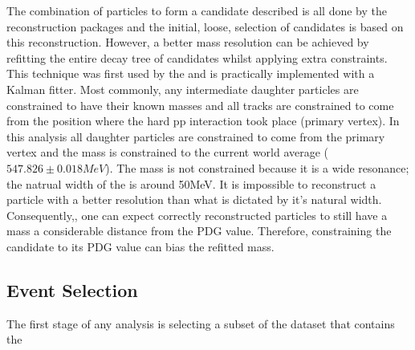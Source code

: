 The combination of particles to form a \Bd candidate described is all done by the \lhcb reconstruction packages and the initial, loose, selection of \Bd candidates is based on this reconstruction. However, a better mass resolution can be achieved by refitting the entire decay tree of \Bd candidates whilst applying extra constraints.  This technique was first used by the \babar and is practically implemented with a Kalman fitter\cite{Hulsbergen:2005pu}.  Most commonly, any intermediate daughter particles are constrained to have their known masses and all tracks are constrained to come from the position where the hard pp interaction took place (primary vertex).  In this analysis all daughter particles are constrained to come from the primary vertex and the \etaz mass is constrained to the current world average ($547.826\pm0.018MeV$)\cite{PDG2014}.  The \Kstar mass is not constrained because it is a wide resonance; the natrual width of the \Kstar is around 50MeV.  It is impossible to reconstruct a particle with a better resolution than what is dictated by it's natural width.  Consequently,, one can expect correctly reconstructed \Kstar particles to still have a mass a considerable distance from the PDG value.  Therefore, constraining the \Kstar candidate to its PDG value can bias the refitted \Bd mass.

\subsection{Event Selection}
\label{sec:Selection}


The first stage of any analysis is selecting a subset of the \lhcb dataset that contains the 



